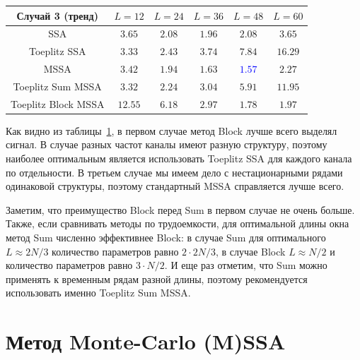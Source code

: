 \documentclass[specialist,
substylefile = spbu_report.rtx,
subf,href,colorlinks=true, 12pt]{disser}
\theoremstyle{definition}
\begin{document}
\begin{table}[h]
\begin{tabular}{cccccc}
			\hhline{======}
			Случай 3 (тренд)                 & $L=12$  & $L=24$                     & $L=36$                     & $L=48$                     & $L=60$          \\
			\hline
			SSA                              & $3.65$  & $2.08$                     & $\mathbf{1.96}$            & $2.08$                     & $3.65$          \\
			\hline
			Toeplitz SSA                     & $3.33$  & $\mathbf{2.43}$            & $3.74$                     & $7.84$                     & $16.29$         \\
			\hline
			MSSA                             & $3.42$  & $1.94$                     & $1.63$                     & \textcolor{blue}{${\mathbf{1.57}}$} & $2.27$          \\
			\hline
			Toeplitz Sum MSSA                & $3.32$  & $\mathbf{2.24}$            & $3.04$                     & $5.91$                     & $11.95$         \\
			\hline
			Toeplitz Block MSSA              & $12.55$ & $6.18$                     & $2.97$                     & $\mathbf{1.78}$            & $1.97$          \\
			\hline
		\end{tabular}
	\label{tab:mse}
\end{table}

Как видно из таблицы~\ref{tab:mse}, в первом случае метод Block лучше всего выделял сигнал. В случае разных частот каналы имеют разную структуру, поэтому наиболее оптимальным является использовать Toeplitz SSA для каждого канала по отдельности.  В третьем случае мы имеем дело с нестационарными рядами одинаковой структуры, поэтому стандартный MSSA справляется лучше всего. 

Заметим, что преимущество Block перед Sum в первом случае не очень больше. Также, если сравнивать методы по трудоемкости, для оптимальной длины окна метод Sum численно эффективнее Block: в случае Sum для оптимального $L\approx 2N/3$ количество параметров равно $2\cdot 2N/3$, в случае Block $L\approx N/2$ и количество параметров равно $3 \cdot N/2$. И еще раз отметим, что Sum можно применять к временным рядам разной длины, поэтому рекомендуется использовать именно Toeplitz Sum MSSA.

\chapter{Метод Monte-Carlo (M)SSA}\label{chpt:mc-ssa}
\end{document}
